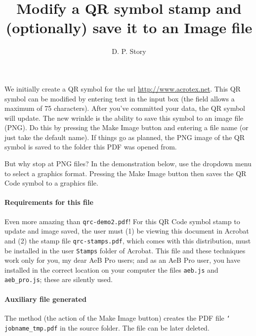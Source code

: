 \documentclass{article}
\title{\texorpdfstring{Modify a QR symbol stamp and (optionally) save it to an Image file}
    {Modify a QR Symbol and save as Image}}
\author{D. P. Story}
\def\cs#1{\texttt{\char`\\#1}}
\begin{document}
\makeinlinetitle

We initially create a QR symbol for the url \url{http://www.acrotex.net}. This QR symbol can be modified
by entering text in the input box (the field allows a maximum of 75 characters). After you've committed your data, the
QR symbol will update. The new wrinkle is the ability to save this symbol to an image file (PNG). Do this
by pressing the \textsf{Make Image} button and entering a file name (or just take the default name). If things
go as planned, the PNG image of the QR symbol is saved to the folder this PDF was opened from.

\space
{}\olBdry
{}

But why stop at PNG files? In the demonstration below, use the dropdown menu to select a graphics format.
Pressing the \textsf{Make Image} button then saves the QR Code symbol to a graphics file.

\space
{}\olBdry
{}\olBdry
{}

\paragraph*{Requirements for this file} Even more amazing than \texttt{qrc-demo2.pdf}! For this QR Code symbol stamp
to update and image saved, the user must (1) be viewing this document in
\textsf{Acrobat} and (2) the stamp file \texttt{qrc-stamps.pdf}, which comes
with this distribution, must be installed in the user \texttt{Stamps} folder
of \textsf{Acrobat}. This file and these techniques work only for you, my dear
AeB Pro users; and as an AeB Pro user, you have installed in the correct
location on your computer the files \texttt{aeb.js} and \texttt{aeb\_pro.js};
these are silently used.

\paragraph*{Auxiliary file generated} The method (the action of the \textsf{Make Image} button) creates the PDF
file \cs{jobname\_tmp.pdf} in the source folder. The file can be later
deleted.
\end{document}
